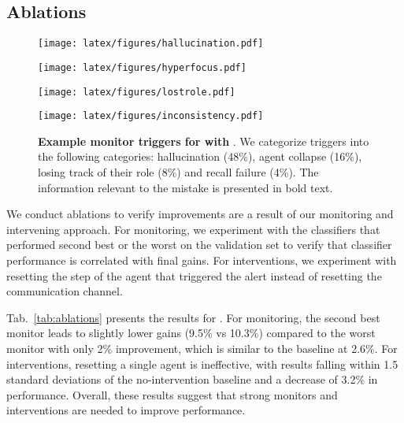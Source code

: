 \subsection{Ablations}

\begin{figure*}
    \centering
    \begin{minipage}[t]{0.24\textwidth}
        \centering
        \texttt{[image: latex/figures/hallucination.pdf]}
       
        \label{fig:hallucination}
    \end{minipage}
    \hfill
    \begin{minipage}[t]{0.24\textwidth}
        \centering
        \texttt{[image: latex/figures/hyperfocus.pdf]}
        \label{fig:hyperfocus}
    \end{minipage}
    \hfill
    \begin{minipage}[t]{0.24\textwidth}
        \centering
        \texttt{[image: latex/figures/lostrole.pdf]}
        \label{fig:lostrole}
    \end{minipage}
    \hfill
    \begin{minipage}[t]{0.24\textwidth}
        \centering
        \texttt{[image: latex/figures/inconsistency.pdf]}
        \label{fig:inconsistency}
    \end{minipage}
    \vspace{-15pt}
    \caption{\textbf{Example monitor triggers for \ourenvasym{} with \llama{}}. We categorize triggers into  the following categories: hallucination (48\%), agent collapse (16\%), losing track of their role (8\%) and recall failure (4\%). The information relevant to the mistake is presented in bold text.}
    \label{fig:examples}
\end{figure*}

We conduct ablations to verify improvements are a result of our monitoring and intervening approach.
For monitoring, we experiment with the classifiers that performed second best or the worst on the validation set to verify that classifier performance is correlated with final gains.
For interventions, we experiment with resetting the step of the agent that triggered the alert instead of resetting the communication channel.

Tab.~\ref{tab:ablations} presents the results for \qwen{}.
For monitoring, the second best monitor leads to slightly lower gains (9.5\% vs 10.3\%) compared to the worst monitor with only 2\% improvement, which is similar to the baseline at 2.6\%. 
For interventions, resetting a single agent is ineffective, with results falling within 1.5 standard deviations of the no-intervention baseline and a decrease of 3.2\% in performance.
Overall, these results suggest that strong monitors and interventions are needed to improve performance.


